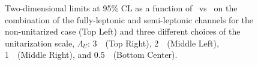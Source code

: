 \begin{figure}[h!]
\begin{center}
\end{center}
\caption{Two-dimensional limits at 95\% CL as a function of \fszero~vs \fsone~on the combination of the fully-leptonic and semi-leptonic channels for the non-unitarized case (Top Left)
and three different choices of the unitarization scale, $\Lambda_U$:
3~\TeV~(Top Right), 2~\TeV~(Middle Left), 1~\TeV~(Middle Right), and 0.5~\TeV~(Bottom Center).}

 \label{fig:aqgc_combined_2d}
 \end{figure}



